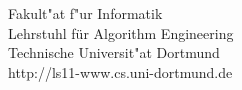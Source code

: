 \begin{titlepage}
\vspace*{2.5cm}
\hspace*{\links}
\begin{minipage}[b]{8cm}
\normalsize
\raggedright
Fakult"at f"ur Informatik\\
Lehrstuhl für Algorithm Engineering\\
Technische Universit"at Dortmund \\
http://ls11-www.cs.uni-dortmund.de
\end{minipage}

\end{titlepage}